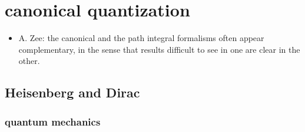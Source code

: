 \chapter{canonical quantization}
\begin{itemize}
	\item A. Zee: the canonical and the path integral formalisms often appear complementary, in the sense that results difficult to see in one are clear in the other.
\end{itemize}

\section{Heisenberg and Dirac}
\subsection{quantum mechanics}
